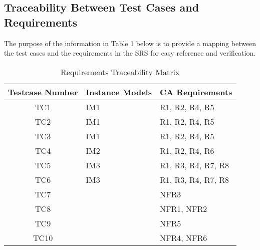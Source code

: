 \documentclass[12pt, titlepage]{article}
\begin{document}
\subsection{Traceability Between Test Cases and Requirements}
The purpose of the information in Table 1 below is to provide a mapping between the test cases and the requirements in the SRS for easy reference and verification.
\begin{table}
	
	\caption{Requirements Traceability Matrix}
	
	\label{Table:Table_Traceability}  
	
	\begin{tabular}{|c|p{5cm}|p{5cm}|}
		
		\hline	
		
		\textbf{Testcase Number} & \textbf{Instance Models} & \textbf{CA Requirements}\\
		
		\hline 
		
		TC1& IM1         & R1, R2, R4, R5       \\ \hline
		
		TC2& IM1        & R1, R2, R4, R5       \\ \hline
		
		TC3& IM1        & R1, R2, R4, R5       \\ \hline
		
		
		
		TC4& IM2 & R1, R2, R4, R6   \\ \hline
		
		TC5& IM3 & R1, R3, R4, R7, R8   \\ \hline
		
		
		
		TC6& IM3 & R1, R3, R4, R7, R8   \\ \hline
		
		TC7&     & NFR3   \\ \hline
		
		
		
		TC8&       & NFR1, NFR2  \\ \hline
		
		TC9&       & NFR5   \\ \hline
		
		TC10&       & NFR4, NFR6   \\ \hline
		
		
		
		
	\end{tabular}\\
	
\end{table}
\end{document}
